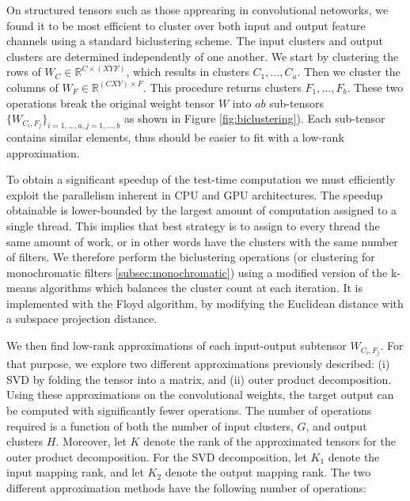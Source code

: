 On structured tensors such as those apprearing in convolutional netoworks,
we found it to be most efficient to cluster
over both input and output feature channels using a standard biclustering scheme.
 The input clusters and output clusters are determined independently of one another. 
We start by clustering the rows of $W_C \in \mathbb{R}^{C \times (XYF)}$, which results in
clusters $C_1, \dots, C_a$. Then we cluster the columns of $W_F  \in
\mathbb{R}^{(CXY) \times F}$. This procedure returns clusters $F_1,
\dots, F_b$. These two operations break the original weight tensor $W$
into $ab$ sub-tensors $\{W_{C_i, F_j}\}_{i = 1, \dots, a, j = 1,
  \dots, b}$ as shown in Figure \ref{fig:biclustering}). Each
sub-tensor contains similar elements, thus should be easier to
fit with a low-rank approximation. 

To obtain a significant speedup of the test-time computation we must
efficiently exploit the parallelism inherent in CPU and GPU
architectures. The speedup obtainable is lower-bounded by the largest
amount of computation assigned to a single thread. This implies that
best strategy is to assign to every thread the same amount of work, or in other words
have the clusters with the same number of filters. 
We therefore perform the biclustering operations (or clustering 
for monochromatic filters \ref{subsec:monochromatic}) using a modified
version of the k-means algorithms which balances the cluster count at
each iteration. 
It is implemented with the Floyd algorithm, by modifying the Euclidean distance
with a subspace projection distance.

%
We then find low-rank approximations of each input-output subtensor $W_{C_i, F_j}$.
For that purpose, we explore two different approximations previously described: (i) SVD by folding the tensor into a matrix,
and (ii) outer product decomposition.
Using these approximations on the convolutional weights, the target
output can be computed with significantly fewer operations. The number
of operations required is a function of both the number
of input clusters, $G$, and output clusters $H$.  Moreover, let $K$ denote the
rank of the approximated tensors for the outer product decomposition.
For the SVD decomposition, let $K_1$ denote the input mapping rank, and let $K_2$ denote the output mapping rank. The two different approximation methods have the following number of
operations:

